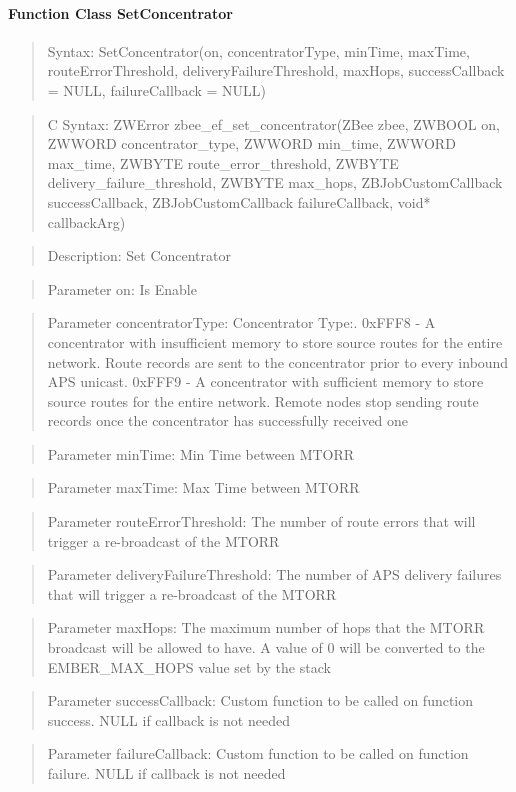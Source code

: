 \paragraph{Function Class SetConcentrator}
\begin{quote}Syntax: SetConcentrator(on, concentratorType, minTime, maxTime, routeErrorThreshold, deliveryFailureThreshold, maxHops, successCallback = NULL, failureCallback = NULL)\end{quote}
\begin{quote}C Syntax: ZWError zbee\_ef\_set\_concentrator(ZBee zbee, ZWBOOL on, ZWWORD concentrator\_type, ZWWORD min\_time, ZWWORD max\_time, ZWBYTE route\_error\_threshold, ZWBYTE delivery\_failure\_threshold, ZWBYTE max\_hops, ZBJobCustomCallback successCallback, ZBJobCustomCallback failureCallback, void* callbackArg)\end{quote}
\begin{quote}Description: Set Concentrator\end{quote}
\begin{quote}Parameter on: Is Enable\end{quote}
\begin{quote}Parameter concentratorType: Concentrator Type:. 0xFFF8 - A concentrator with insufficient memory to store source routes for the entire network. Route records are sent to the concentrator prior to every inbound APS unicast. 0xFFF9 - A concentrator with sufficient memory to store source routes for the entire network. Remote nodes stop sending route records once the concentrator has successfully received one\end{quote}
\begin{quote}Parameter minTime: Min Time between MTORR\end{quote}
\begin{quote}Parameter maxTime: Max Time between MTORR\end{quote}
\begin{quote}Parameter routeErrorThreshold: The number of route errors that will trigger a re-broadcast of the MTORR\end{quote}
\begin{quote}Parameter deliveryFailureThreshold: The number of APS delivery failures that will trigger a re-broadcast of the MTORR\end{quote}
\begin{quote}Parameter maxHops: The maximum number of hops that the MTORR broadcast will be allowed to have. A value of 0 will be converted to the EMBER\_MAX\_HOPS value set by the stack\end{quote}
\begin{quote}Parameter successCallback: Custom function to be called on function success. NULL if callback is not needed\end{quote}
\begin{quote}Parameter failureCallback: Custom function to be called on function failure. NULL if callback is not needed\end{quote}


